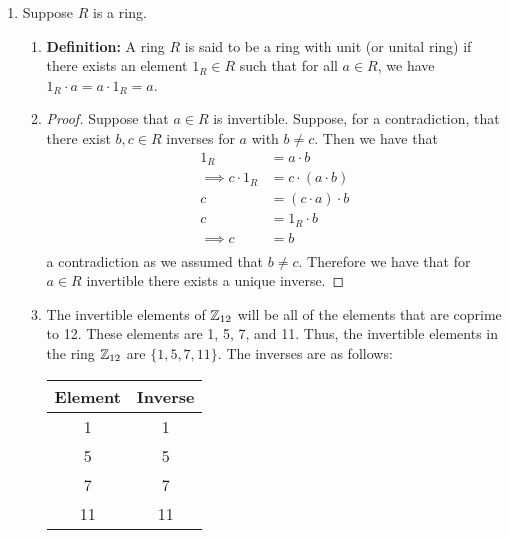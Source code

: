 \documentclass{article}
\begin{document}
\begin{enumerate}
\begin{enumerate}
\begin{proof}
            Therefore, we conclude that $\varphi$ is injective if and only if $\ker(\varphi) = \{0\}$.
        \end{proof}
    \end{enumerate}


    \item Suppose $R$ is a ring.
    \begin{enumerate}
        \item %
        \textbf{Definition: }A ring $R$ is said to be a ring with unit (or unital ring) if there exists an element $1_R \in R$ such that for all $a \in R$, we have $1_R \cdot a = a \cdot 1_R = a$.
        \item %
        \begin{proof}
            Suppose that $a \in R$ is invertible. Suppose, for a contradiction, that there exist $b, c \in R$ inverses for $a$ with $b \neq c$. Then we have that 
            \begin{align*}
                1_R &= a \cdot b \\
                \implies c \cdot 1_R &= c \cdot (a \cdot b) \\
                c &= (c \cdot a) \cdot b \\
                c &= 1_R \cdot b \\
                \implies c &= b \\
            \end{align*}
            a contradiction as we assumed that $b \neq c$. Therefore we have that for $a \in R$ invertible there exists a unique inverse.
        \end{proof}
        \item %
        The invertible elements of $\mathbb{Z}_{12}$ will be all of the elements that are coprime to 12. These elements are 1, 5, 7, and 11. Thus, the invertible elements in the ring $\mathbb{Z}_{12}$ are $\{1, 5, 7, 11\}$. The inverses are as follows:
        \begin{center}
            \begin{tabular}{c | c}
                Element & Inverse \\
                \hline
                1 & 1 \\
                5 & 5 \\
                7 & 7 \\
                11 & 11 \\
            \end{tabular}
        \end{center}
    \end{enumerate}


\end{enumerate}
\end{document}
